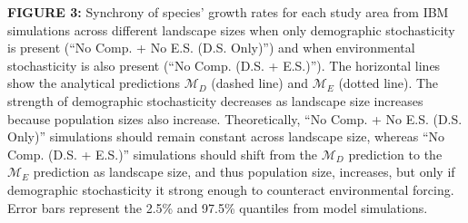 \documentclass[12pt,]{article}
\begin{document}
\textbf{FIGURE 3:} Synchrony of species' growth rates for each study area from IBM simulations across different landscape sizes when only demographic stochasticity is present (``No Comp. + No E.S. (D.S. Only)'') and when environmental stochasticity is also present (``No Comp. (D.S. + E.S.)''). The horizontal lines show the analytical predictions $\mathcal{M}_D$ (dashed line) and $\mathcal{M}_E$ (dotted line). The strength of demographic stochasticity decreases as landscape size increases because population sizes also increase. Theoretically, ``No Comp. + No E.S. (D.S. Only)'' simulations should remain constant across landscape size, whereas ``No Comp. (D.S. + E.S.)'' simulations should shift from the $\mathcal{M}_D$ prediction to the $\mathcal{M}_E$ prediction as landscape size, and thus population size, increases, but only if demographic stochasticity it strong enough to counteract environmental forcing. Error bars represent the 2.5\% and 97.5\% quantiles from model simulations.
\end{document}
